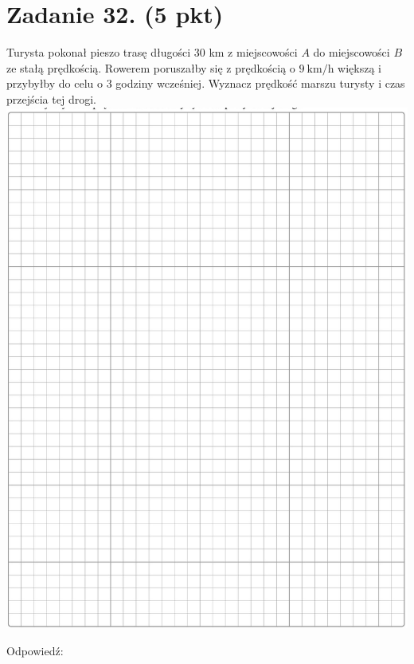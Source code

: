 \documentclass[10pt]{article}
\begin{document}
\section*{Zadanie 32. (5 pkt)}
Turysta pokonał pieszo trasę długości 30 km z miejscowości \(A\) do miejscowości \(B\) ze stałą prędkością. Rowerem poruszałby się z prędkością o \(9 \mathrm{~km} / \mathrm{h}\) większą i przybyłby do celu o 3 godziny wcześniej. Wyznacz prędkość marszu turysty i czas przejścia tej drogi.\\
\includegraphics[max width=\textwidth, center]{2024_11_21_a38d702bc7be8115942cg-13}

Odpowiedź:
\end{document}
